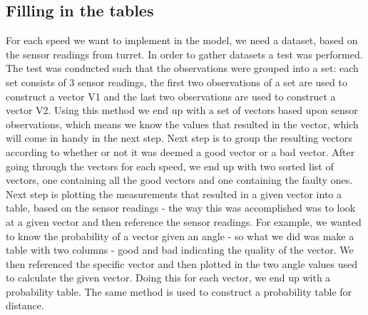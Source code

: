 \subsection{Filling in the tables}
For each speed we want to implement in the model, we need a dataset, based on
the sensor readings from turret. In order to gather datasets a test was
performed. The test was conducted such that the observations were grouped into a
set: each set consists of 3 sensor readings, the first two observations of a set
are used to construct a vector V1 and the last two observations are used to
construct a vector V2. Using this method we end up with a set of vectors based
upon sensor observations, which means we know the values that resulted in the
vector, which will come in handy in the next step.
Next step is to group the resulting vectors according to whether or not it was
deemed a good vector or a bad vector. After going through the vectors for each
speed, we end up with two sorted list of vectors, one containing all the good
vectors and one containing the faulty ones. Next step is plotting the 
measurements that resulted in a given vector into a table, based on the sensor
readings - the way this was accomplished was to look at a given vector and then
reference the sensor readings. For example, we wanted to know the probability of
a vector given an angle - so what we did was make a table with two columns -
good and bad indicating the quality of the vector. We then referenced the
specific vector and then plotted in the two angle values used to calculate the
given vector. Doing this for each vector, we end up with a probability table.
The same method is used to construct a probability table for distance.
